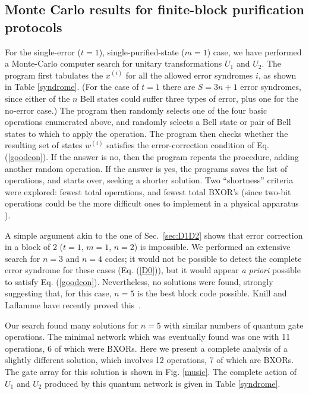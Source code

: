 \subsection{Monte Carlo results for finite-block purification protocols}
\label{subsec:MCres}
 
For the single-error ($t=1$), single-purified-state ($m=1$) case, we
have performed a Monte-Carlo computer search for unitary
transformations $U_1$ and $U_2$.  The program first tabulates the
$x^{(i)}$ for all the allowed error syndromes $i$, as shown in Table
\ref{syndrome}.  (For the case of $t=1$ there are $S=3n+1$ error
syndromes, since either of the $n$ Bell states could suffer three
types of error, plus one for the no-error case.)  The program then
randomly selects one of the four basic operations enumerated above,
and randomly selects a Bell state or pair of Bell states to which to
apply the operation.  The program then checks whether the resulting
set of states $w^{(i)}$ satisfies the error-correction condition
of Eq. (\ref{goodcon}).  If the answer is no, then the program
repeats the procedure, adding another random operation.  If the answer
is yes, the programs saves the list of operations, and starts over,
seeking a shorter solution.  Two ``shortness'' criteria were explored:
fewest total operations, and fewest total BXOR's (since two-bit operations
could be the more difficult ones to implement in a physical apparatus
\cite{G9}).
 
A simple argument akin to the one of Sec.~\ref{sec:D1D2} shows that
error correction in a block of 2 ($t=1$, $m=1$, $n=2$) is impossible.
We performed an extensive search for $n=3$ and $n=4$ codes; it would
not be possible to detect the complete error syndrome for these cases
(Eq.  (\ref{D0})), but it would appear {\it a priori} possible to
satisfy Eq. (\ref{goodcon}).  Nevertheless, no solutions were found,
strongly suggesting that, for this case, $n=5$ is the best block code
possible\cite{Laflamme}.  Knill and Laflamme have recently proved
this~\cite{lafknill}.
 
Our search found many solutions for $n=5$ with similar numbers of
quantum gate operations.  The minimal network which was eventually
found was one with 11 operations, 6 of which were BXORs.  Here we
present a complete analysis of a slightly different solution, which
involves 12 operations, 7 of which are BXORs.  The gate array for
this solution is shown in Fig. \ref{music}.  The complete action
of $U_1$ and $U_2$ produced by this quantum network is given in
Table \ref{syndrome}.
 

